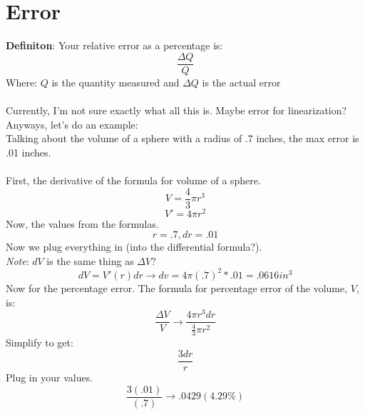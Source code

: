 \documentclass{article}
\begin{document}
\section{Error}
\textbf{Definiton}: Your relative error as a percentage is: \[\frac{\Delta Q}{Q}\]
Where: $Q$ is the quantity measured and $\Delta Q$ is the actual error\\\\
Currently, I'm not sure exactly what all this is. Maybe error for linearization? Anyways, let's do an example:\\
Talking about the volume of a sphere with a radius of .7 inches, the max error is .01 inches.\\\\
First, the derivative of the formula for volume of a sphere.
\[V = \frac{4}{3}\pi r^3\]
\[V' = 4\pi r^2\]
Now, the values from the formulas.
\[r = .7, dr = .01\]
Now we plug everything in (into the differential formula?).\\
\textit{Note}: $dV$ is the same thing as $\Delta V$?
\[dV = V'(r)dr \to dv = 4\pi (.7)^2 * .01 = .0616 in^3\]
Now for the percentage error. The formula for percentage error of the volume, $V$, is:
\[\frac{\Delta V}{V} \to \frac{4\pi r^3 dr}{\frac{4}{3}\pi r^2}\]
Simplify to get:
\[\frac{3dr}{r}\]
Plug in your values.
\[\frac{3(.01)}{(.7)} \to .0429 (4.29\%)\]
\end{document}
